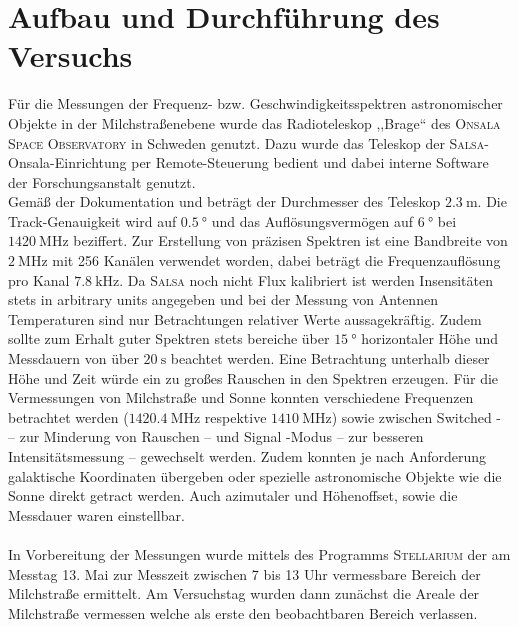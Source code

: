 \section{Aufbau und Durchführung des Versuchs}
\label{sec:Aufbau}
Für die Messungen der Frequenz- bzw. Geschwindigkeitsspektren astronomischer Objekte in der Milchstraßenebene wurde das Radioteleskop ,,Brage`` des \textsc{Onsala Space Observatory} in Schweden genutzt.
Dazu wurde das Teleskop der \textsc{Salsa}-Onsala-Einrichtung per Remote-Steuerung bedient und dabei interne Software der Forschungsanstalt genutzt.\\
Gemäß der Dokumentation \cite{Usermanual} und \cite{AntennaResp} beträgt der Durchmesser des Teleskop $\SI{2.3}{\metre}$. Die Track-Genauigkeit wird auf $\SI{0.5}{\degree}$ und das Auflösungsvermögen auf $\SI{6}{\degree}$ bei $\SI{1420}{\mega \hertz}$ beziffert.
Zur Erstellung von präzisen Spektren ist eine Bandbreite von $\SI{2}{\mega \hertz}$ mit 256 Kanälen verwendet worden, dabei beträgt die Frequenzauflösung pro Kanal $\SI{7.8}{\kilo \hertz}$.
Da \textsc{Salsa} noch nicht Flux kalibriert ist werden Insensitäten stets in \dq arbitrary units\dq{} angegeben und bei der Messung von Antennen Temperaturen sind nur Betrachtungen relativer Werte aussagekräftig.
Zudem sollte zum Erhalt guter Spektren stets bereiche über $\SI{15}{\degree}$ horizontaler Höhe und Messdauern von über $\SI{20}{\second}$ beachtet werden. Eine Betrachtung unterhalb dieser Höhe und Zeit würde ein zu großes Rauschen in den Spektren erzeugen.
Für die Vermessungen von Milchstraße und Sonne konnten verschiedene Frequenzen betrachtet werden ($\SI{1420.4}{\mega \hertz}$ respektive $\SI{1410}{\mega \hertz}$) sowie zwischen \dq Switched\dq{} - -- zur Minderung von Rauschen --  und \dq Signal\dq{} -Modus -- zur besseren Intensitätsmessung -- gewechselt werden.
Zudem konnten je nach Anforderung galaktische Koordinaten übergeben oder spezielle astronomische Objekte wie die Sonne direkt getract werden.
Auch azimutaler und Höhenoffset, sowie die Messdauer waren einstellbar.\\ 
\\ 
In Vorbereitung der Messungen wurde mittels des Programms \textsc{Stellarium} der am Messtag 13. Mai zur Messzeit zwischen 7 bis 13 Uhr vermessbare Bereich der Milchstraße ermittelt.
Am Versuchstag wurden dann zunächst die Areale der Milchstraße vermessen welche als erste den beobachtbaren Bereich verlassen.
